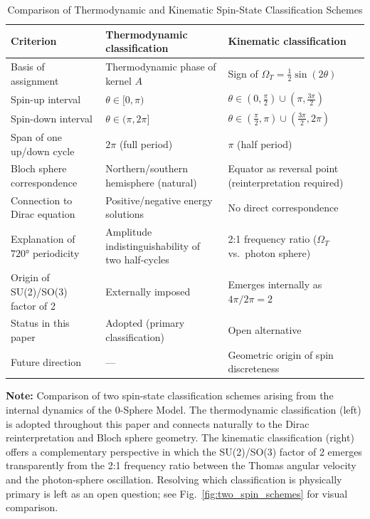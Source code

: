\documentclass[%
 reprint,
 amsmath,amssymb,
 aps,
 prb,
]{revtex4-2}
\numberwithin{equation}{section}
\theoremstyle{definition}
\theoremstyle{remark}
\begin{document}
\begin{table}[t!]
\centering
\caption{Comparison of Thermodynamic and Kinematic Spin-State Classification Schemes}
\label{tab:spin_classification}
\renewcommand{\arraystretch}{1.4}
\begin{tabular}{p{5.0cm}p{5.5cm}p{5.5cm}}
\toprule
\textbf{Criterion} & \textbf{Thermodynamic classification} & \textbf{Kinematic classification} \\
\midrule
Basis of assignment
  & Thermodynamic phase of kernel $A$
  & Sign of $\Omega_T = \tfrac{1}{2}\sin(2\theta)$ \\
\addlinespace[0.25cm]
Spin-up interval
  & $\theta \in [0, \pi)$
  & $\theta \in (0,\tfrac{\pi}{2}) \cup (\pi, \tfrac{3\pi}{2})$ \\
\addlinespace[0.25cm]
Spin-down interval
  & $\theta \in (\pi, 2\pi]$
  & $\theta \in (\tfrac{\pi}{2}, \pi) \cup (\tfrac{3\pi}{2}, 2\pi)$ \\
\addlinespace[0.25cm]
Span of one up/down cycle
  & $2\pi$ (full period)
  & $\pi$ (half period) \\
\addlinespace[0.25cm]
Bloch sphere correspondence
  & Northern/southern hemisphere (natural)
  & Equator as reversal point (reinterpretation required) \\
\addlinespace[0.25cm]
Connection to Dirac equation
  & Positive/negative energy solutions
  & No direct correspondence \\
\addlinespace[0.25cm]
Explanation of $720°$ periodicity
  & Amplitude indistinguishability of two half-cycles
  & 2:1 frequency ratio ($\Omega_T$ vs.\ photon sphere) \\
\addlinespace[0.25cm]
Origin of SU(2)/SO(3) factor of 2
  & Externally imposed
  & Emerges internally as $4\pi/2\pi = 2$ \\
\addlinespace[0.25cm]
Status in this paper
  & Adopted (primary classification)
  & Open alternative \\
\addlinespace[0.25cm]
Future direction
  & ---
  & Geometric origin of spin discreteness \\
\bottomrule
\end{tabular}
\vspace{0.2cm}
\begin{flushleft}
\footnotesize
\textbf{Note:} Comparison of two spin-state classification schemes arising from the internal dynamics of the 0-Sphere Model. The thermodynamic classification (left) is adopted throughout this paper and connects naturally to the Dirac reinterpretation and Bloch sphere geometry. The kinematic classification (right) offers a complementary perspective in which the SU(2)/SO(3) factor of 2 emerges transparently from the 2:1 frequency ratio between the Thomas angular velocity and the photon-sphere oscillation. Resolving which classification is physically primary is left as an open question; see Fig.~\ref{fig:two_spin_schemes} for visual comparison.
\end{flushleft}
\end{table}
\end{document}
